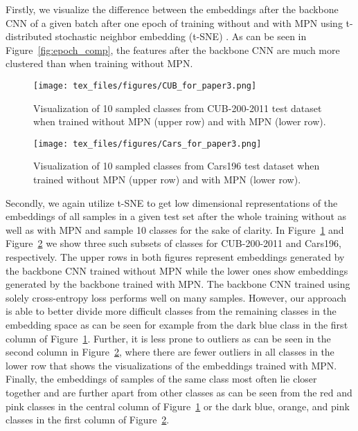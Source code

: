 \documentclass{article}
\begin{document}
Firstly, we visualize the difference between the embeddings after the backbone CNN of a given batch after one epoch of training without and with MPN using t-distributed stochastic neighbor embedding (t-SNE) \cite{DBLP:journals/ml/MaatenH12}. As can be seen in Figure~\ref{fig:epoch_comp}, the features after the backbone CNN are much more clustered than when training without MPN.

\begin{figure}[ht!]
    \begin{center}
    \centerline{\texttt{[image: tex\_files/figures/CUB\_for\_paper3.png]}}
    \caption{Visualization of 10 sampled classes from CUB-200-2011 test dataset when trained without MPN (upper row) and with MPN (lower row).}
    \label{fig:cub_vis}
    \end{center}
\end{figure}

\begin{figure}[ht!]
    \begin{center}
    \centerline{\texttt{[image: tex\_files/figures/Cars\_for\_paper3.png]}}
    \caption{Visualization of 10 sampled classes from Cars196 test dataset when trained without MPN (upper row) and with MPN (lower row).}
    \label{fig:cars_vis}
    \end{center}
    \vspace{-0.7cm}
\end{figure}

Secondly, we again utilize t-SNE \cite{DBLP:journals/ml/MaatenH12} to get low dimensional representations of the embeddings of all samples in a given test set after the whole training without as well as with MPN and sample 10 classes for the sake of clarity. In Figure~\ref{fig:cub_vis} and Figure~\ref{fig:cars_vis} we show three such subsets of classes for CUB-200-2011 and Cars196, respectively. The upper rows in both figures represent embeddings generated by the backbone CNN trained without MPN while the lower ones show embeddings generated by the backbone trained with MPN. 
The backbone CNN trained using solely cross-entropy loss performs well on many samples. However, our approach is able to better divide more difficult classes from the remaining classes in the embedding space as can be seen for example from the dark blue class in the first column of Figure~\ref{fig:cub_vis}. 
Further, it is less prone to outliers as can be seen in the second column in Figure~\ref{fig:cars_vis}, where there are fewer outliers in all classes in the lower row that shows the visualizations of the embeddings trained with MPN. 
Finally, the embeddings of samples of the same class most often lie closer together and are further apart from other classes as can be seen from the red and pink classes in the central column of Figure~\ref{fig:cub_vis} or the dark blue, orange, and pink classes in the first column of Figure~\ref{fig:cars_vis}.
\end{document}
